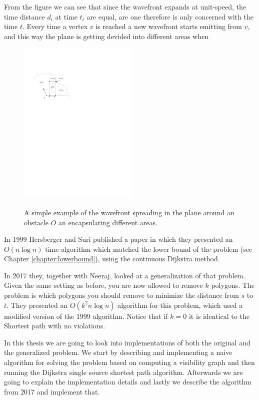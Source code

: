 From the figure we can see that since the wavefront expands at unit-speed, the time distance
$d_i$ at time $t_i$ are equal, are one therefore is only concerned with the time $t$.
Every time a vertex $v$ is reached a new wavefront starts emitting from $v$, and this way
the plane is getting devided into different areas when 

\begin{figure}[H]
    \centering
	\includegraphics[width=0.5\textwidth]{figures/introductiontowavefront.pdf}
	\label{fig:introductiontowavefront}
	\caption{A simple example of the wavefront spreading in the plane around an obstacle $O$
	         an encapsulating different areas.}
\end{figure}

In 1999 Hersberger and Suri published a
paper\cite{HershbergerS99} in which they presented an $O(n\log n)$ time
algorithm which matched the lower bound of the problem (see
Chapter \ref{chapter:lowerbound}), using the continuous
Dijkstra method.


In 2017 they, together with Neeraj, looked at a generalization of that problem.
Given the same setting as before, you are now allowed to remove $k$ polygons.
The problem is which polygons you should remove to minimize the distance from
$s$ to $t$. They presented an $O(k^2 n\log n)$ algorithm for this problem,
which used a modified version of the 1999 algorithm\cite{HershbergerKS17}.
Notice that if $k=0$ it is identical to the Shortest path with no violations.

In this thesis we are going to look into implementations of both the original
and the generalized problem. We start by describing and implementing a naive algorithm for solving
the problem based on computing a visibility graph and then running the Dijkstra
single source shortest path algorithm. Afterwards we are going to explain the
implementation details and lastly we describe the algorithm from 2017 and
implement that.

